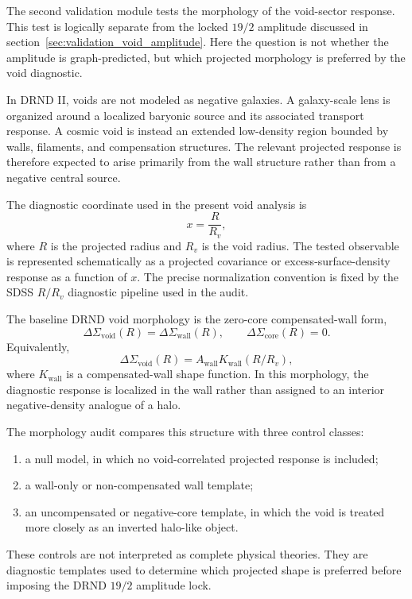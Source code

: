 \documentclass[12pt]{iopart}
\begin{document}
The second validation module tests the morphology of the void-sector response. This test is logically separate from the locked \(19/2\) amplitude discussed in section~\ref{sec:validation_void_amplitude}. Here the question is not whether the amplitude is graph-predicted, but which projected morphology is preferred by the void diagnostic.

In DRND II, voids are not modeled as negative galaxies. A galaxy-scale lens is organized around a localized baryonic source and its associated transport response. A cosmic void is instead an extended low-density region bounded by walls, filaments, and compensation structures. The relevant projected response is therefore expected to arise primarily from the wall structure rather than from a negative central source.

The diagnostic coordinate used in the present void analysis is
\begin{equation}
x=\frac{R}{R_v},
\end{equation}
where \(R\) is the projected radius and \(R_v\) is the void radius. The tested observable is represented schematically as a projected covariance or excess-surface-density response as a function of \(x\). The precise normalization convention is fixed by the SDSS \(R/R_v\) diagnostic pipeline used in the audit.

The baseline DRND void morphology is the zero-core compensated-wall form,
\begin{equation}
\Delta\Sigma_{\mathrm{void}}(R)
=
\Delta\Sigma_{\mathrm{wall}}(R),
\qquad
\Delta\Sigma_{\mathrm{core}}(R)=0.
\label{eq:zero_core_void}
\end{equation}
Equivalently,
\begin{equation}
\Delta\Sigma_{\mathrm{void}}(R)
=
A_{\mathrm{wall}}K_{\mathrm{wall}}(R/R_v),
\label{eq:void_wall_shape}
\end{equation}
where \(K_{\mathrm{wall}}\) is a compensated-wall shape function. In this morphology, the diagnostic response is localized in the wall rather than assigned to an interior negative-density analogue of a halo.

The morphology audit compares this structure with three control classes:
\begin{enumerate}
    \item a null model, in which no void-correlated projected response is included;
    \item a wall-only or non-compensated wall template;
    \item an uncompensated or negative-core template, in which the void is treated more closely as an inverted halo-like object.
\end{enumerate}
These controls are not interpreted as complete physical theories. They are diagnostic templates used to determine which projected shape is preferred before imposing the DRND \(19/2\) amplitude lock.
\end{document}
